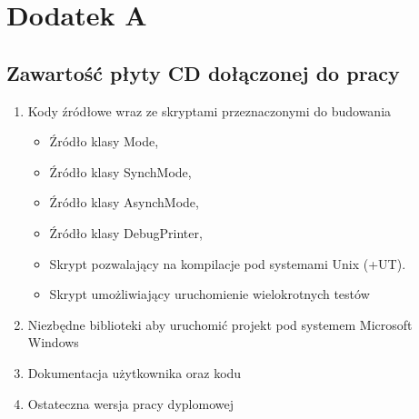 \documentclass{BscUS}
\begin{document}
\newpage
\pagestyle{empty}
\appendix
\chapter*{Dodatek A} \label{App:AppendixA}
\section*{Zawartość płyty CD dołączonej do pracy}

\begin{enumerate}
\item Kody źródłowe wraz ze skryptami przeznaczonymi do budowania
\begin{itemize}
\item Źródło klasy Mode,
\item Źródło klasy SynchMode,
\item Źródło klasy AsynchMode,
\item Źródło klasy DebugPrinter,
\item Skrypt pozwalający na kompilacje pod systemami Unix (+UT).
\item Skrypt umożliwiający uruchomienie wielokrotnych testów
\end{itemize}
\item Niezbędne biblioteki aby uruchomić projekt pod systemem Microsoft Windows
\item Dokumentacja użytkownika oraz kodu
\item Ostateczna wersja pracy dyplomowej
\end{enumerate}
\end{document}
